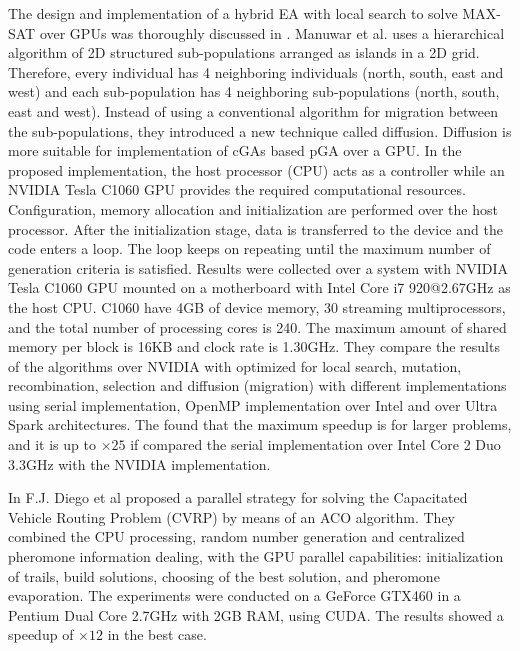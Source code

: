 \documentclass[review]{elsarticle}
\begin{document}
The design and implementation of a hybrid EA with local search to solve MAX-SAT over GPUs was thoroughly discussed in \cite{Munawar:2009:HGA:1666141_1666143}. Manuwar et al. uses a hierarchical algorithm of 2D structured sub-populations arranged as islands in a 2D grid. Therefore, every individual has 4 neighboring individuals (north, south, east and west) and each sub-population has 4 neighboring sub-populations (north, south, east and west). Instead of using a conventional algorithm for migration between the sub-populations, they introduced a new technique called diffusion. Diffusion is more suitable for implementation of cGAs based pGA over a GPU. In the proposed implementation, the host processor (CPU) acts as a controller while an NVIDIA Tesla C1060 GPU provides the required computational resources. Configuration, memory allocation and initialization are performed over the host processor. After the initialization stage, data is transferred to the device and the code enters a loop. The loop keeps on repeating until the maximum number of generation criteria is satisfied. Results were collected over a system with NVIDIA Tesla C1060 GPU mounted on a motherboard with Intel Core i7 920@2.67GHz as the host CPU. C1060 have 4GB of device memory, 30 streaming multiprocessors, and the total number of processing cores is 240. The maximum amount of shared memory per block is 16KB and clock rate is 1.30GHz. They compare the results of the algorithms over NVIDIA with optimized for local search, mutation, recombination, selection and diffusion (migration) with different implementations using serial implementation, OpenMP implementation over Intel and over Ultra Spark architectures. The found that the maximum speedup is for larger problems, and it is up to $\times25$ if compared the serial implementation over Intel Core 2 Duo 3.3GHz with the NVIDIA implementation. 

In \cite{fjdiego-vrp} F.J. Diego et al proposed a parallel strategy for solving the Capacitated Vehicle Routing Problem (CVRP) by means of an ACO algorithm. They combined the CPU processing, random number generation and centralized pheromone information dealing, with the GPU parallel capabilities: initialization of trails, build solutions, choosing of the best solution, and pheromone evaporation. The experiments were conducted on a GeForce GTX460 in a Pentium Dual Core 2.7GHz with 2GB RAM, using CUDA. The results showed a speedup of $\times12$ in the best case.
\end{document}
